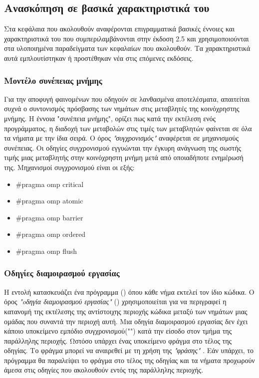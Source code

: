 \subsection{Ανασκόπηση σε βασικά χαρακτηριστικά του \emph{}}
Στα κεφάλαια που ακολουθούν αναφέρονται επιγραμματικά βασικές έννοιες και χαρακτηριστικά του \emph{} που
συμπεριλαμβάνονται στην έκδοση 2.5 και χρησιμοποιούνται στα υλοποιημένα παραδείγματα των κεφαλαίων που ακολουθούν. Τα
χαρακτηριστικά αυτά εμπλουτίστηκαν ή προστέθηκαν νέα στις επόμενες εκδόσεις.

\subsubsection{Μοντέλο συνέπειας μνήμης}
Για την αποφυγή φαινομένων \emph{} που οδηγούν σε λανθασμένα αποτελέσματα, απαιτείται συχνά ο
συντονισμός πρόσβασης των νημάτων στις μεταβλητές της κοινόχρηστης μνήμης. Η έννοια "συνέπεια μνήμης", ορίζει πως κατά την εκτέλεση ενός προγράμματος, η διαδοχή των μεταβολών στις τιμές των μεταβλητών φαίνεται σε όλα τα νήματα με την ίδια σειρά. Ο όρος \emph{"συγχρονισμός"} αναφέρεται σε μηχανισμούς συνέπειας. Οι οδηγίες συγχρονισμού εγγυώνται την έγκυρη ανάγνωση της σωστής τιμής μιας μεταβλητής
στην κοινόχρηστη μνήμη μετά από οποιαδήποτε ενημέρωσή της. Μηχανισμοί συγχρονισμού είναι οι εξής\cite{book2_23}:
\begin{itemize}
    \item {\#}pragma omp critical 
    \item {\#}pragma omp atomic
    \item {\#}pragma omp barrier 
    \item {\#}pragma omp ordered
    \item {\#}pragma omp flush
\end{itemize}

\subsubsection{Οδηγίες διαμοιρασμού εργασίας}
Η εντολή \textbf{} κατασκευάζει ένα \textbf{} πρόγραμμα (\emph{}) όπου κάθε νήμα εκτελεί τον ίδιο κώδικα. Ο όρος \emph{"oδηγία διαμοιρασμού εργασίας"}
(\emph{}) χρησιμοποιείται για να περιγραφεί η κατανομή της εκτέλεσης της αντίστοιχης περιοχής
κώδικα μεταξύ των νημάτων μιας ομάδας που συναντά την περιοχή αυτή.
\clearpage
Μια οδηγία διαμοιρασμού εργασίας δεν έχει κάποιο υποκείμενο εμπόδιο συγχρονισμού("\emph{}") κατά την είσοδο
στον τμήμα της παράλληλης περιοχής. Ωστόσο υπάρχει ένας υποκείμενο φράγμα στο τέλος της οδηγίας. Το φράγμα μπορεί να
αναιρεθεί με τη χρήση της \emph{"φράσης"}  \textbf{}. Εάν υπάρχει, το πρόγραμμα θα παραλείψει το
φράγμα στο τέλος της οδηγίας και τα νήματα προχωρούν άμεσα
στις οδηγίες που ακολουθούν εντός της παράλληλης περιοχής\cite{openmpse16}.
\ \\
